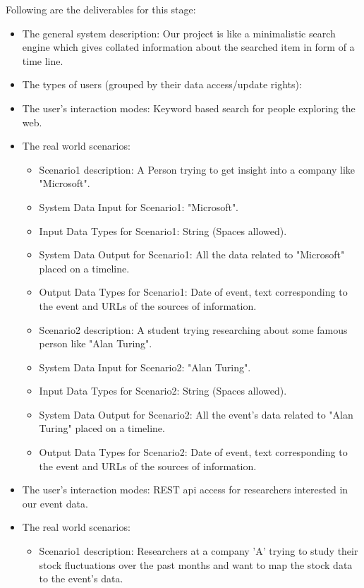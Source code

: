 \textnormal{
Following are the deliverables for this stage:
}

\begin{itemize} 
\item{The general system description: } 
Our project is like a minimalistic search engine which gives collated information about the searched item in form of a time line.
\item{The types of users (grouped by their data access/update rights): }
\item{The user's interaction modes: }
Keyword based search for people exploring the web.
\item{The real world scenarios: }
	\begin{itemize} 
	\item{Scenario1 description: }
	A Person trying to get insight into a company like "Microsoft".
	\item{System Data Input for Scenario1: }
	"Microsoft".
	\item{Input Data Types for Scenario1: }
	String (Spaces allowed).
	\item{System Data Output for Scenario1: }
	All the data related to "Microsoft" placed on a timeline.
	\item{Output Data Types for Scenario1: }
	Date of event, text corresponding to the event and URLs of the sources of information.
	\item{Scenario2 description: }
	A student trying researching about some famous person like "Alan Turing".
	\item{System Data Input for Scenario2: }
	"Alan Turing".
	\item{Input Data Types for Scenario2: }
	String (Spaces allowed).
	\item{System Data Output for Scenario2: }
	All the event's data related to "Alan Turing" placed on a timeline.
	\item{Output Data Types for Scenario2: }
	Date of event, text corresponding to the event and URLs of the sources of information.
	\end{itemize}
\item{The user's interaction modes: }
REST api access for researchers interested in our event data.
\item{The real world scenarios: }
	\begin{itemize} 
	\item{Scenario1 description: }
	Researchers at a company 'A' trying to study their stock fluctuations over the past months and want to map the stock data to the event's data.

\end{itemize}
\end{itemize}
